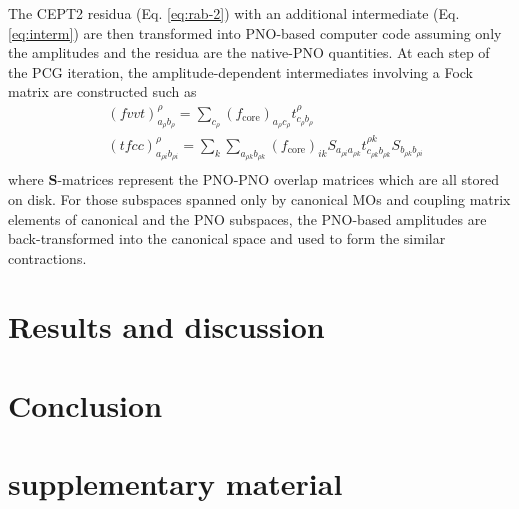\documentclass[aip,jcp,amsmath]{revtex4-1}
\begin{document}
%
The CEPT2 residua (Eq. \ref{eq:rab-2}) with an additional intermediate (Eq. \ref{eq:interm}) are then transformed into PNO-based computer code assuming only the amplitudes and the residua are the native-PNO quantities.
%
At each step of the PCG iteration, the amplitude-dependent intermediates involving a Fock matrix are constructed such as
%
\begin{align}
  &(fvvt)_{a_{\rho}b_{\rho}}^\rho=\sum_{c_{\rho}} (f_\text{core})_{a_{\rho}c_{\rho}}t_{c_{\rho}b_{\rho}}^\rho \nonumber \\
  &(tfcc)_{a_{\rho i}b_{\rho i}}^\rho=\sum_{k} \sum_{a_{\rho k}b_{\rho k}} (f_\text{core})_{ik} S_{a_{\rho i}a_{\rho k}}t_{c_{\rho k}b_{\rho k}}^{\rho k} S_{b_{\rho k}b_{\rho i}} \nonumber \\
\end{align}
%
where $\mathbf{S}$-matrices represent the PNO-PNO overlap matrices which are all stored on disk.
%
For those subspaces spanned only by canonical MOs and coupling matrix elements of canonical and the PNO subspaces, the PNO-based amplitudes are back-transformed into the canonical space and used to form the similar contractions.

%


%

\section{Results and discussion}\label{Sec:results}

\section{Conclusion}\label{Sec:Conclusion}

\section*{supplementary material}

\begin{acknowledgments}  
  
\end{acknowledgments}


\end{document}
